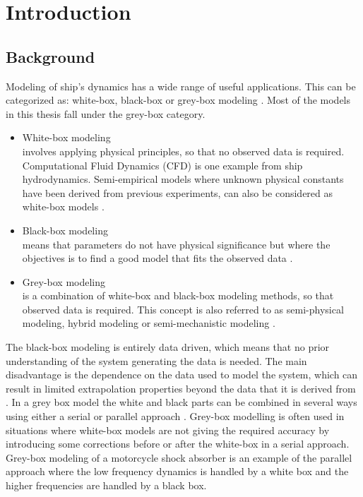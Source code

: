 \chapter{Introduction}
\section{Background}
Modeling of ship’s dynamics has a wide range of useful applications. This can be categorized as: white-box, black-box or grey-box modeling \cite{leifsson_grey-box_2008}. Most of the models in this thesis fall under the grey-box category.

\begin{itemize}
    \item White-box modeling \\
    involves applying physical principles, so that no observed data is required. Computational Fluid Dynamics (CFD) is one example from ship hydrodynamics. Semi-empirical models where unknown physical constants have been derived from previous experiments, can also be considered as white-box models \cite{leifsson_grey-box_2008}.  

    \item Black-box modeling \\
    means that parameters do not have physical significance but where the objectives is to find a good model that fits the observed data \cite{lindskog_tools_1995}.
    
    \item Grey-box modeling \\
    is a combination of white-box and black-box modeling methods, so that observed data is required. This concept is also referred to as semi-physical modeling, hybrid modeling or semi-mechanistic modeling \cite{leifsson_grey-box_2008}. 
\end{itemize}

\noindent The black-box modeling is entirely data driven, which means that no prior understanding of the system generating the data is needed. The main disadvantage is the dependence on the data used to model the system, which can result in limited extrapolation properties beyond the data that it is derived from \cite{leifsson_grey-box_2008}. 
In a grey box model the white and black parts can be combined in several ways using either a serial or parallel approach \cite{leifsson_grey-box_2008}. 
Grey-box modelling is often used in situations where white-box models are not giving the required accuracy by introducing some corrections before or after the white-box in a serial approach. 
Grey-box modeling of a motorcycle shock absorber \cite{beghi_grey-box_2007} is an example of the parallel approach where the low frequency dynamics is handled by a white box and the higher frequencies are handled by a black box.

